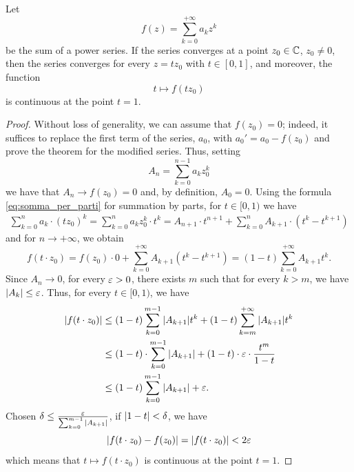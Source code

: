 \begin{theorem}
\mymark{*}%
\label{th:lemma_abel}%
%
%
Let
\[
  f(z) = \sum_{k=0}^{+\infty} a_k z^k
\]
be the sum of a power series. 
If the series converges at a point $z_0\in {\mathbb C}$, $z_0\neq 0$, 
then the series converges for every $z=t z_0$ with $t\in [0,1]$, and moreover,
the function
\[
  t \mapsto f(tz_0)
\]
is continuous at the point $t=1$.
\end{theorem}
%
\begin{proof}
Without loss of generality, we can assume that $f(z_0)=0$; indeed, it suffices
to replace the first term of the series, $a_0$, with $a_0' = a_0 - f(z_0)$ and
prove the theorem for the modified series.
Thus, setting
\[
  A_n = \sum_{k=0}^{n-1} a_k z_0^k
\]
we have that $A_n \to f(z_0) = 0$ and, by definition, $A_0 = 0$.
Using the formula \eqref{eq:somma_per_parti} for summation by parts, for $t\in
[0,1)$
we have
\begin{align*}
\sum_{k=0}^n a_k \cdot (tz_0)^k
= \sum_{k=0}^n a_k z_0^k \cdot t^k
= A_{n+1} \cdot t^{n+1} + \sum_{k=0}^n A_{k+1}\cdot (t^k - t^{k+1})
\end{align*}
and for $n\to +\infty$, we obtain
\[
  f(t\cdot z_0) = f(z_0)\cdot 0 + \sum_{k=0}^{+\infty}A_{k+1}(t^k-t^{k+1})
  = (1-t)\sum_{k=0}^{+\infty} A_{k+1} t^k.
\]
Since $A_n \to 0$, for every $\varepsilon>0$, there exists $m$ such that for every $k >
m$, we have ${\left|A_k\right|} \le  \varepsilon$. Thus, for every $t\in [0,1)$, we have
\begin{align*}
{\left|f(t\cdot z_0)\right|}
 &\le (1-t)\sum_{k=0}^{m-1} {\left|A_{k+1}\right|} t^k
  + (1-t)\sum_{k=m}^{+\infty} {\left|A_{k+1}\right|} t^k \\
  &\le (1-t)\cdot \sum_{k=0}^{m-1}{\left|A_{k+1}\right|} + (1-t)\cdot \varepsilon \cdot
 \frac{t^{m}}{1-t} \\
 &\le (1-t)\sum_{k=0}^{m-1}{\left|A_{k+1}\right|} + \varepsilon.
\end{align*}
Chosen $\delta \le \frac{\varepsilon} {\sum_{k=0}^{m-1} {\left|A_{k+1}\right|}}$, if
${\left|1-t\right|}<\delta$, we have
\[
  {\left|f(t\cdot z_0)-f(z_0)\right|} = {\left|f(t\cdot z_0)\right|} < 2\varepsilon
\]
which means that $t\mapsto f(t\cdot z_0)$ is continuous at the point $t=1$.
\end{proof}
